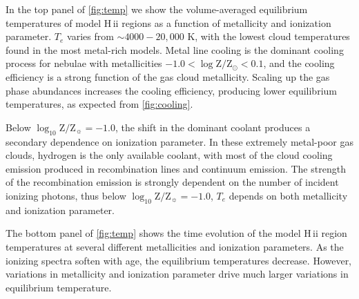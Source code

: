 \documentclass[twocolumn, tighten]{aastex61}
\newcommand{\Fig}[1]{\autoref{fig:#1}}
\newcommand{\logten}{\ensuremath{\log_{10}}}
\newcommand{\Te}{\ensuremath{T_{e}}}
\newcommand{\hii}{H\,{\sc ii}\xspace}
\newcommand{\logZeq}[1]{\ensuremath{\logten \mathrm{Z}/\mathrm{Z}_{\sun} = #1}}
\begin{document}
In the top panel of \Fig{temp} we show the volume-averaged equilibrium temperatures of model \hii regions as a function of metallicity and ionization parameter. \Te{} varies from $\sim 4000-20,000$ K, with the lowest cloud temperatures found in the most metal-rich models. Metal line cooling is the dominant cooling process for nebulae with metallicities $-1.0 < \log \mathrm{Z}/\mathrm{Z}_{\odot} < 0.1$, and the cooling efficiency is a strong function of the gas cloud metallicity. Scaling up the gas phase abundances increases the cooling efficiency, producing lower equilibrium temperatures, as expected from \Fig{cooling}.

Below \logZeq{-1.0}, the shift in the dominant coolant produces a secondary dependence on ionization parameter. In these extremely metal-poor gas clouds, hydrogen is the only available coolant, with most of the cloud cooling emission produced in recombination lines and continuum emission. The strength of the recombination emission is strongly dependent on the number of incident ionizing photons, thus below \logZeq{-1.0}, \Te{} depends on both metallicity and ionization parameter.

The bottom panel of \Fig{temp} shows the time evolution of the model \hii region temperatures at several different metallicities and ionization parameters. As the ionizing spectra soften with age, the equilibrium temperatures decrease. However, variations in metallicity and ionization parameter drive much larger variations in equilibrium temperature.
\end{document}
